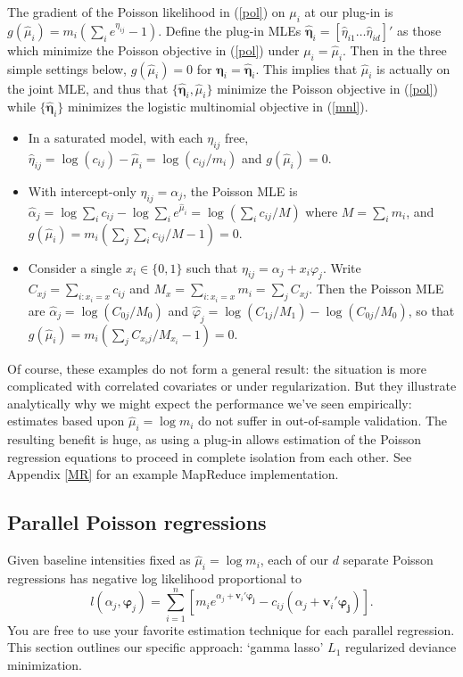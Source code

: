 \documentclass[12pt]{article}
\newcommand{\bs}[1]{\boldsymbol{#1}}
\newcommand{\bm}[1]{\mathbf{#1}}
\begin{document}
The gradient of the Poisson likelihood in (\ref{pol}) on $\mu_i$ at our
plug-in is $g(\hat \mu_i) = m_i \left(\sum_i e^{\eta_{ij}}-1\right)$.  
Define the plug-in MLEs $\bs{\hat\eta}_{i}
  = [\hat\eta_{i1}\ldots\hat\eta_{id}]'$ as those which minimize the Poisson
  objective in (\ref{pol}) under $\mu_i=\hat\mu_i$.  Then in the
three simple settings below, $g(\hat
\mu_i)=0$ for $\bs{\eta}_i = \bs{\hat\eta}_{i}$. This implies that $\hat\mu_i$
is actually on the joint MLE, and thus that $\{\bs{\hat\eta}_{i},\hat\mu_i\}$ minimize the
 Poisson objective in (\ref{pol}) while $\{ \bs{\hat\eta}_{i}\}$ minimizes the logistic multinomial objective in (\ref{mnl}).
\begin{itemize}
\item In a saturated model, with
each $\eta_{ij}$ free, $\hat
\eta_{ij} = \log(c_{ij}) - \hat \mu_i = \log(c_{ij}/m_i)$ and $g(\hat
\mu_i) = 0$.
\item With intercept-only $\eta_{ij} =
\alpha_j$, the Poisson MLE is $\hat\alpha_j = \log \sum_i c_{ij} - \log
\sum_i e^{\hat\mu_i} = \log\left( \sum_i c_{ij}/M \right)$ where $M = \sum_i
m_i$, and $g(\hat \mu_i) = m_i(\sum_j \sum_i c_{ij}/M -1) = 0$.
\item Consider a single
$x_i \in
\{0,1\}$ such that $\eta_{ij} = \alpha_j + x_i \varphi_j$.  Write $C_{xj} = \sum_{i: x_i=x} c_{ij}$ and  $M_{x} = \sum_{i:
x_i=x} m_i = \sum_j C_{xj}$.  Then the Poisson MLE are $\hat\alpha_j =
\log(C_{0j}/M_0)$ and $\hat\varphi_j = \log(C_{1j}/M_1) - \log(C_{0j}/M_0)$,
so that  $g(\hat \mu_i) = m_i\left(\sum_j C_{x_ij}/M_{x_i} -1 \right) =0$.
\end{itemize}
Of course, these examples do not form a general result: the situation is more
complicated with correlated covariates or under regularization. But they
illustrate analytically why we might expect the performance we've seen
empirically: estimates based upon $\hat \mu_i = \log m_i$ do not suffer in
out-of-sample validation. The resulting benefit is huge, as using a plug-in
allows estimation of the Poisson regression equations to proceed in complete
isolation from each other.  See Appendix \ref{MR} for an example MapReduce implementation.

\subsection{Parallel Poisson regressions}
\label{GL}

Given baseline intensities fixed as $\hat \mu_i = \log m_i$, each of our $d$
separate Poisson regressions has negative log likelihood proportional to
\begin{equation}\label{obj}
l(\alpha_j, \bs{\varphi}_j) = \sum_{i=1}^n \left[ m_i 
e^{\alpha_j + \bm{v}_i'\bs{\varphi_j}} - c_{ij}(\alpha_j + \bm{v}_i'\bs{\varphi_j})\right].
\end{equation}
You are free to use your favorite estimation technique for each parallel
regression. This section outlines our specific approach:  `gamma lasso' $L_1$ regularized deviance minimization.
\end{document}
